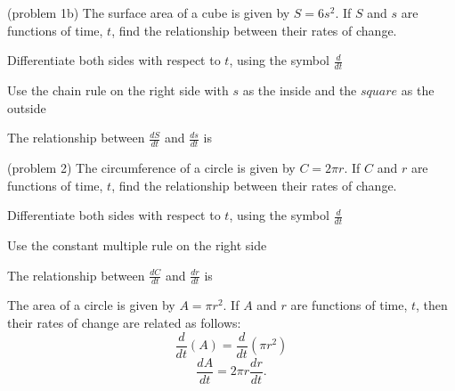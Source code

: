 \documentclass[handout]{ximera}
\begin{document}
\begin{problem}(problem 1b)
The surface area of a cube is given by $S = 6s^2$. If $S$ and $s$ are functions of time, $t$, 
find the relationship between their rates of change.\\
\begin{hint}
Differentiate both sides with respect to $t$, using the symbol $\frac{d}{dt}$
\end{hint}
\begin{hint}
Use the chain rule on the right side with $s$ as the inside and the $square$ as the outside
\end{hint}

The relationship between $\frac{dS}{dt}$ and $\frac{ds}{dt}$ is
\begin{multipleChoice}
\end{multipleChoice}
\end{problem}


\begin{problem}(problem 2)
The circumference of a circle is given by $C = 2\pi r$. If $C$ and $r$ are functions of time, $t$,
find the relationship between their rates of change.\\
\begin{hint}
Differentiate both sides with respect to $t$, using the symbol $\frac{d}{dt}$
\end{hint}
\begin{hint}
Use the constant multiple rule on the right side
\end{hint}

The relationship between $\frac{dC}{dt}$ and $\frac{dr}{dt}$ is
\begin{multipleChoice}
\end{multipleChoice}
\end{problem}



\begin{example}[example 3]
The area of a circle is given by $A = \pi r^2$. If $A$ and $r$ are functions of time, $t$, 
then their rates of change are related as follows:
\[\frac{d}{dt} (A) = \frac{d}{dt}(\pi r^2)\]
\[\frac{dA}{dt}  = 2\pi r \frac{dr}{dt}.\]
\end{example}
\end{document}
